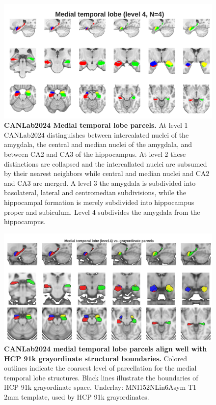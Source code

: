 \documentclass[10pt,letterpaper]{article}
\begin{document}
\begin{figure}[t]
\begin{minipage}{\linewidth}
\end{minipage}
\begin{minipage}{\linewidth}
\includegraphics[width=\linewidth]{images/mtl_coarsest.png}
\end{minipage}
\caption{
{\bf
CANLab2024 Medial temporal lobe parcels.} At level 1 CANLab2024 distinguishes between intercalated nuclei of the amygdala, the central and median nuclei of the amygdala, and between CA2 and CA3 of the hippocampus. At level 2 these distinctions are collapsed and the intercallated nuclei are subsumed by their nearest neighbors while central and median nuclei and CA2 and CA3 are merged. A level 3 the amygdala is subdivided into basolateral, lateral and centromedian subdivisions, while the hippocampal formation is merely subdivided into hippocampus proper and subiculum. Level 4 subdivides the amygdala from the hippocampus.
}
\label{mtl-granularities-figure}
\end{figure}


\begin{figure}[t!]
\centering
\includegraphics[width=\linewidth]{images/mtl_vs_cifti.png}
\caption{
{\bf
CANLab2024 medial temporal lobe parcels align well with HCP 91k grayordinate structural boundaries.} 
Colored outlines indicate the coarsest level of parcellation for the medial temporal lobe structures. Black lines illustrate the boundaries of HCP 91k grayordinate space. Underlay: MNI152NLin6Asym T1 2mm template, used by HCP 91k grayordinates.}
\label{mtl-vs-cifti-figure}
\end{figure}
\end{document}
